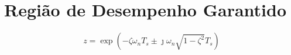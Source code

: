 \chapter{Região de Desempenho Garantido}

\begin{equation}
  z = \exp{\left(-\zeta\omega_nT_s\pm\jmath\omega_n\sqrt{1-\zeta^2}T_s\right)}
\end{equation}